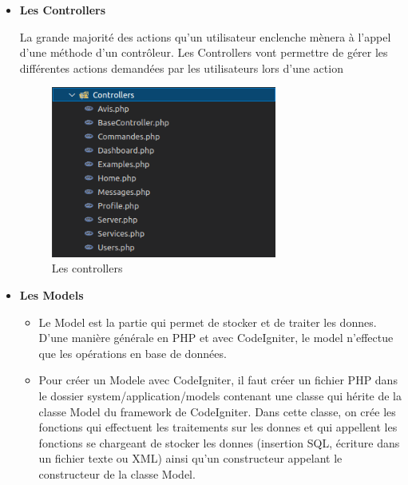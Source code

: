 \documentclass[french]{report}
\begin{document}
\begin{itemize}
    \item \textbf{Les Controllers}
    
        La grande majorité des actions qu'un utilisateur enclenche mènera à
        l'appel d'une méthode d'un contrôleur. Les  Controllers   vont permettre
        de gérer les différentes actions demandées par les utilisateurs lors
        d'une action
    
    \begin{figure}[H]
        \centering
        \includegraphics[width=0.7\textwidth]{images/controlers.png}
        \caption{Les controllers}
        \label{fig:my_label}
    \end{figure}
    
    \item \textbf{Les Models}
    \begin{itemize}
        \item  Le Model est la partie qui permet de stocker et de traiter les
            donnes.  D'une manière générale en PHP et avec CodeIgniter, le model
            n'effectue que les opérations en base de données.
        \item Pour créer un Modele avec CodeIgniter, il faut créer un fichier
            PHP dans le dossier system/application/models contenant une classe
            qui hérite de la classe Model du framework de CodeIgniter. Dans
            cette classe, on crée les fonctions qui effectuent les traitements
            sur les donnes et qui appellent les fonctions se chargeant de
            stocker les donnes (insertion SQL, écriture dans un fichier texte ou
            XML) ainsi qu'un constructeur appelant le constructeur de la classe
            Model.
    \end{itemize}


\end{itemize}
\end{document}
